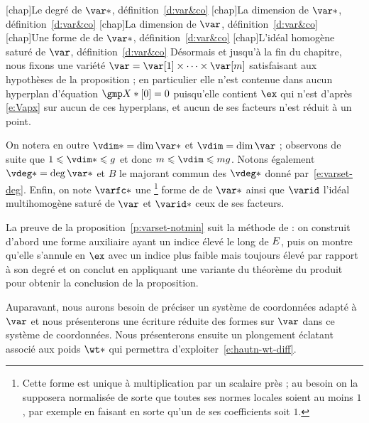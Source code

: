 \begin{nota} \label{n:var&co}
  \nomuse {}
  \nomuse{\vdeg*}[chap]{Le degré de \( \var* \), définition~\vref{d:var&co}}
  \nomuse{\vdim*}[chap]{La dimension de \( \var* \),
    définition~\vref{d:var&co}}
  \nomuse{\vdim }[chap]{La dimension de \( \var \), définition~\vref{d:var&co}}
  \nomuse{\varfc*}[chap]{Une forme de  de \( \var* \),
    définition~\vref{d:var&co}}
  \nomuse{\varid}[chap]{L'idéal homogène saturé de \( \var \),
    définition~\vref{d:var&co}}
  Désormais et jusqu'à la fin du chapitre, nous fixons une variété
  \( \var = \var[1] \times \dots \times \var[\puiss] \) satisfaisant aux
  hypothèses de la proposition ; en particulier elle n'est contenue dans aucun
  hyperplan d'équation \( \vmp*[0] = 0 \) puisqu'elle contient
  \( \ex \) qui n'est d'après \eqref{e:Vapx} sur aucun de ces hyperplans, et
  aucun de ses facteurs n'est réduit à un point.

  On notera en outre \( \vdim* = \dim \var* \) et \( \vdim = \dim \var \) ;
  observons de suite que \( 1 \le \vdim* \le \genre \) et donc \( \puiss \le
    \vdim \le \puiss\genre \). Notons également
  \( \vdeg* = \deg \var* \) et \( B \) le majorant commun des \( \vdeg* \)
  donné par~\eqref{e:varset-deg}. Enfin, on note \( \varfc* \) une
  \footnote{\label{fn:varfc}Cette forme est unique à multiplication par un
    scalaire près ; au besoin on la supposera normalisée de sorte que toutes
    ses normes locales soient au moins \( 1 \), par exemple en faisant en
    sorte qu'un de ses coefficients soit \( 1 \).}
  forme de  de \( \var* \) ainsi que \( \varid \) l'idéal
  multihomogène saturé de \( \var \) et \( \varid* \) ceux de ses facteurs.
\end{nota}

La preuve de la proposition~\vref{p:varset-notmin} suit la méthode de
\TS : on construit d'abord une forme auxiliaire ayant un indice élevé le long
de \( E \), puis on montre qu'elle s'annule en \( \ex \) avec un indice
plus faible mais toujours élevé par rapport à son degré et on conclut en
appliquant une variante du théorème du produit pour obtenir la conclusion de
la proposition.

Auparavant, nous aurons besoin de préciser un système de coordonnées adapté à
\( \var \) et nous présenterons une écriture réduite des formes sur \( \var \)
dans ce système de coordonnées. Nous présenterons ensuite un plongement
éclatant associé aux poids \( \wt* \) qui permettra
d'exploiter~\eqref{e:hautn-wt-diff}.


